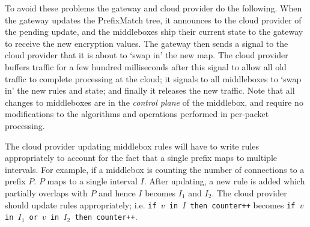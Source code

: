 To avoid these problems the gateway and cloud provider do the following. 
When the gateway updates the PrefixMatch tree, it announces to the cloud provider of the pending update, and the middleboxes ship their current state to the gateway to receive the new encryption values.
The gateway then sends a signal to the cloud provider that it is about to `swap in' the new map. 
The cloud provider buffers traffic for a few hundred milliseconds after this signal to allow all old traffic to complete processing at the cloud; it signals to all middleboxes to `swap in' the new rules and state; and finally it releases the new traffic.
Note that all changes to middleboxes are in the {\it control plane} of the middlebox, and require no modifications to the algorithms and operations performed in per-packet processing. 

The cloud provider updating middlebox rules will have to write rules appropriately to account for the fact that a 
single prefix maps to multiple intervals. For example, if a middlebox is counting the number of connections to a 
prefix $P$. $P$ maps to a single interval $I$. After updating, a new rule is added which partially overlaps 
with $P$ and hence $I$ becomes $I_1$ and $I_2$. The cloud provider should update rules appropriately; i.e. 
\texttt{if $v$ in $I$ then counter++} becomes \texttt{if $v$ in $I_1$ or $v$ in $I_2$ then counter++}.

